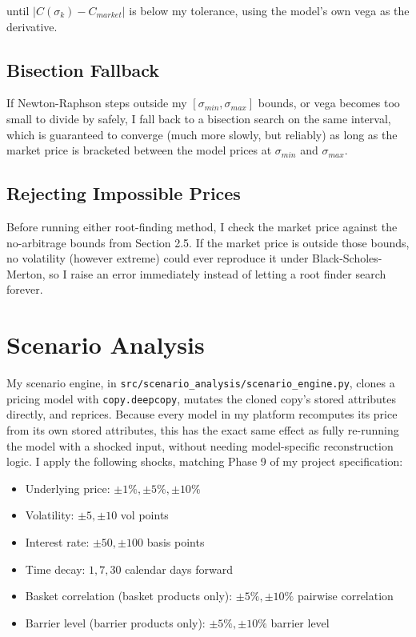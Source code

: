 \documentclass[12pt,a4paper]{article}
\begin{document}
until $|C(\sigma_k) - C_{market}|$ is below my tolerance, using the model's
own vega as the derivative.

\subsection{Bisection Fallback}

If Newton-Raphson steps outside my $[\sigma_{min}, \sigma_{max}]$ bounds, or
vega becomes too small to divide by safely, I fall back to a bisection
search on the same interval, which is guaranteed to converge (much more
slowly, but reliably) as long as the market price is bracketed between the
model prices at $\sigma_{min}$ and $\sigma_{max}$.

\subsection{Rejecting Impossible Prices}

Before running either root-finding method, I check the market price
against the no-arbitrage bounds from Section 2.5. If the market price is
outside those bounds, no volatility (however extreme) could ever reproduce
it under Black-Scholes-Merton, so I raise an error immediately instead of
letting a root finder search forever.

\section{Scenario Analysis}

My scenario engine, in \texttt{src/scenario\_analysis/scenario\_engine.py},
clones a pricing model with \texttt{copy.deepcopy}, mutates the cloned
copy's stored attributes directly, and reprices. Because every model in my
platform recomputes its price from its own stored attributes, this has the
exact same effect as fully re-running the model with a shocked input,
without needing model-specific reconstruction logic. I apply the following
shocks, matching Phase 9 of my project specification:

\begin{itemize}[noitemsep]
    \item Underlying price: $\pm 1\%, \pm 5\%, \pm 10\%$
    \item Volatility: $\pm 5, \pm 10$ vol points
    \item Interest rate: $\pm 50, \pm 100$ basis points
    \item Time decay: $1, 7, 30$ calendar days forward
    \item Basket correlation (basket products only): $\pm 5\%, \pm 10\%$ pairwise correlation
    \item Barrier level (barrier products only): $\pm 5\%, \pm 10\%$ barrier level
\end{itemize}
\end{document}

